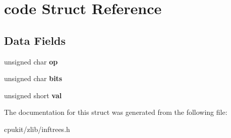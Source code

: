 \hypertarget{structcode}{}\section{code Struct Reference}
\label{structcode}
\subsection*{Data Fields}
\begin{DoxyCompactItemize}
\item 
\mbox{\label{structcode_a4f075d73a9177d05cc7d332105295b83}} 
unsigned char {\bfseries op}
\item 
\mbox{\label{structcode_a5defcebb356dca1a5a8d39995f28d66b}} 
unsigned char {\bfseries bits}
\item 
\mbox{\label{structcode_a6f9c73627997e8fc6df02e620cf9a6f5}} 
unsigned short {\bfseries val}
\end{DoxyCompactItemize}


The documentation for this struct was generated from the following file\+:\begin{DoxyCompactItemize}
\item 
cpukit/zlib/inftrees.\+h\end{DoxyCompactItemize}
